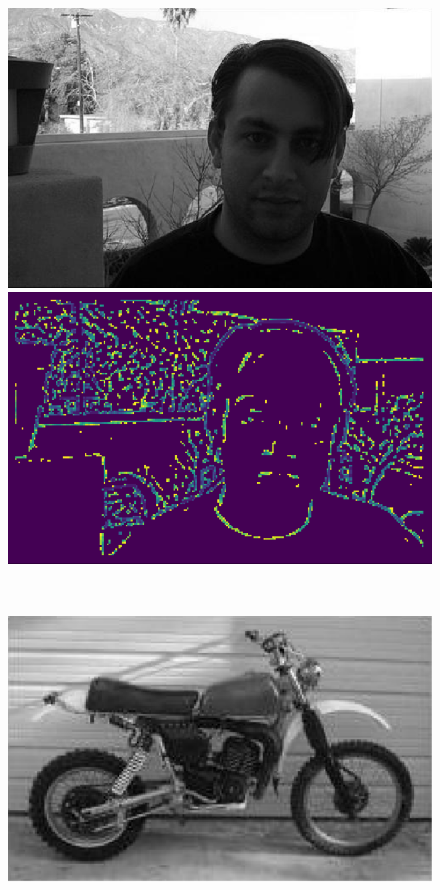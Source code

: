 \documentclass[11pt,a4paper]{scrartcl}
\begin{document}
\begin{figure}[h]
	\centering
	\begin{minipage}[b]{0.48\textwidth}
		\includegraphics[width=\textwidth]{images/dog_face1}
	\end{minipage}
	\hfill
	\begin{minipage}[b]{0.493\textwidth}
		\includegraphics[width=\textwidth]{images/dog_face2}
	\end{minipage}
	\\[0.8em]
	\begin{minipage}[b]{0.498\textwidth}
		\includegraphics[width=\textwidth]{images/dog_motor1}

\end{minipage}
\end{figure}
\end{document}
